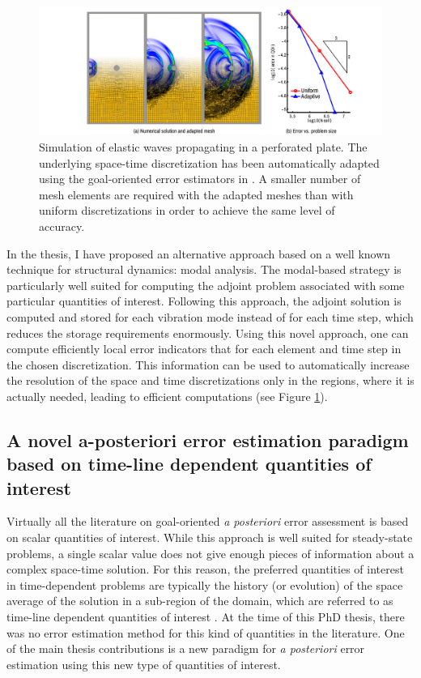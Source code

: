 \documentclass{article}
\begin{document}
\begin{figure}[ht!]
\includegraphics[width=\textwidth]{../_assets/fig17.png}
\caption{Simulation of elastic waves propagating in a perforated plate. The underlying space-time discretization has been automatically adapted using the goal-oriented error estimators in \cite{Verdugo2013}. A smaller number of mesh elements are required with the adapted meshes than with uniform discretizations in order to achieve the same level of accuracy. }
\label{fig:amr-phd}
\end{figure}

In the thesis, I have proposed an alternative approach based on a well known technique for structural dynamics: modal analysis. The modal-based strategy is particularly well suited for computing the adjoint problem associated with some particular quantities of interest. Following this approach, the adjoint solution is computed and stored for each vibration mode instead of for each time step, which reduces the storage requirements enormously. Using this novel approach, one can compute efficiently local error indicators that for each element and time step in the chosen discretization. This information can be used to automatically increase the resolution of the space and time discretizations only in the regions, where it is actually needed, leading to efficient computations (see Figure \ref{fig:amr-phd}). 


\subsection{A novel a-posteriori error estimation paradigm based on time-line dependent quantities of interest}

Virtually all the literature on goal-oriented \emph{a posteriori} error assessment is based on scalar quantities of interest. While this approach is well suited for steady-state problems, a single scalar value does not give enough pieces of information about a complex space-time solution. For this reason, the preferred quantities of interest in time-dependent problems are typically the history (or evolution) of the space average of the solution in a sub-region of the domain, which are referred to as time-line dependent quantities of interest \cite{Verdugo2013}. At the time of this PhD thesis, there was no error estimation method for this kind of quantities in the literature. One of the main thesis contributions is a new paradigm for \emph{a posteriori} error estimation using this new type of quantities of interest.
\end{document}
